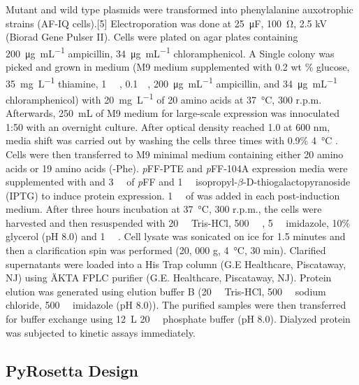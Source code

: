\begin{refsection}
Mutant and wild type plasmids were transformed into  phenylalanine
auxotrophic strains (AF-IQ cells).[5] Electroporation was done at
\SI{25}{\micro\farad}, \SI{100}{\ohm}, 2.5 kV (Biorad Gene Pulser II). Cells were
plated on agar plates containing \SI{200}{\ug\per\mL} ampicillin, \SI{34}{\ug\per\mL}
chloramphenicol. A Single colony was picked and grown in medium (M9 medium
supplemented with 0.2 wt \% glucose, \SI{35}{\mg\per\L} thiamine, \SI{1}{\milli\Molar}
, \SI{0.1}{\milli\Molar}, \SI{200}{\ug\per\mL} ampicillin, and
\SI{34}{\ug\per\mL} chloramphenicol) with \SI{20}{\mg\per\L} of 20 amino acids
at \SI{37}{\celsius}, 300 r.p.m.  Afterwards, \SI{250}{\mL} of M9 medium for
large-scale expression was innoculated 1:50 with an overnight culture.  After
optical density reached 1.0 at 600 nm, media shift was carried out by washing
the cells three times with 0.9\% \SI{4}{\celsius} .  Cells were then
transferred to M9 minimal medium containing either 20 amino acids or 19 amino
acids (-Phe). \emph{p}FF-PTE and \emph{p}FF-104A expression media were
supplemented with and \SI{3}{\milli\Molar} of \emph{p}FF and
\SI{1}{\milli\Molar} isopropyl-$\beta$-D-thiogalactopyranoside (IPTG) to induce
protein expression.  \SI{1}{\milli\Molar} of  was added in each
post-induction medium. After three hours incubation at \SI{37}{\celsius}, 300
r.p.m., the cells were harvested and then resuspended with
\SI{20}{\milli\Molar} Tris-HCl, \SI{500}{\milli\Molar} ,
\SI{5}{\milli\Molar} imidazole, 10\% glycerol (pH 8.0) and \SI{1}{\micro\Molar}
. Cell lysate was sonicated on ice for 1.5 minutes and then a
clarification spin was performed (20, 000 g, \SI{4}{\celsius}, 30 min).
Clarified supernatants were loaded into a His Trap column (G.E Healthcare,
Piscataway, NJ) using ÄKTA FPLC purifier (G.E.  Healthcare, Piscataway, NJ).
Protein elution was generated using elution buffer B (\SI{20}{\milli\Molar}
Tris-HCl, \SI{500}{\milli\Molar} sodium chloride, \SI{500}{\milli\Molar}
imidazole (pH 8.0)).  The purified samples were then transferred for buffer
exchange using \SI{12}{\L} \SI{20}{\milli\Molar} phosphate buffer (pH 8.0).
Dialyzed protein was subjected to kinetic assays immediately.

\subsection{PyRosetta Design}
\label{sec:rosetta-method}


\end{refsection}
